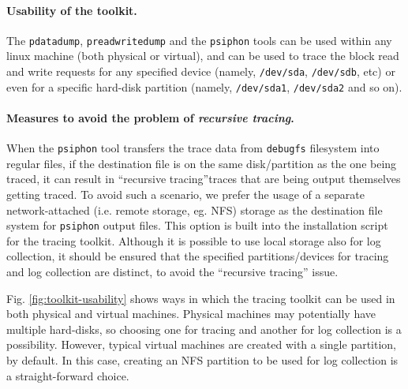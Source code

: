 \paragraph{Usability of the toolkit.}
The \texttt{pdatadump}, \texttt{preadwritedump} and the \texttt{psiphon}
tools can be used within any linux machine (both physical or virtual),
and can be used to trace the block read and write requests for any 
specified device (namely, \texttt{/dev/sda}, \texttt{/dev/sdb}, etc)
or even for a specific hard-disk partition (namely, 
\texttt{/dev/sda1}, \texttt{/dev/sda2} and so on). 

\paragraph{Measures to avoid the problem of \textit{recursive tracing}.}
When the \texttt{psiphon} tool transfers the trace data from 
\texttt{debugfs} filesystem into regular files, if the destination file
is on the same disk/partition as the one being traced, it can 
result in ``recursive tracing''\textemdash{}traces that are being output themselves 
getting traced. To avoid such a scenario, we prefer the usage of a separate
network-attached (i.e. remote storage, eg. NFS) storage as the destination 
file system for \texttt{psiphon} output files. 
This option is built into the installation script for
the tracing toolkit. Although it is possible to use local storage also 
for log collection, it should be ensured that the specified partitions/devices
for tracing and log collection are distinct, to avoid the 
``recursive tracing'' issue.


Fig. \ref{fig:toolkit-usability} shows ways in which the tracing toolkit
can be used in both physical and virtual machines. Physical machines may 
potentially have multiple hard-disks, so choosing one for tracing and
another for log collection is a possibility. However, typical virtual
machines are created with a single partition, by default. In this case,
creating an NFS partition to be used for log collection is a
straight-forward choice.

